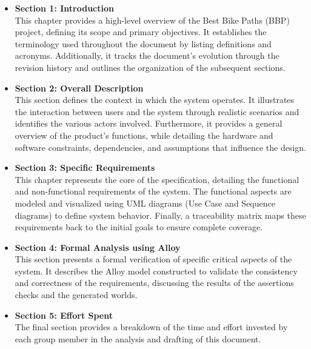 \begin{itemize}
    \item \textbf{Section 1: Introduction} \\
    This chapter provides a high-level overview of the Best Bike Paths (BBP) project, defining its scope and primary objectives. It establishes the terminology used throughout the document by listing definitions and acronyms. Additionally, it tracks the document's evolution through the revision history and outlines the organization of the subsequent sections.

    \item \textbf{Section 2: Overall Description} \\
    This section defines the context in which the system operates. It illustrates the interaction between users and the system through realistic scenarios and identifies the various actors involved. Furthermore, it provides a general overview of the product's functions, while detailing the hardware and software constraints, dependencies, and assumptions that influence the design.

    \item \textbf{Section 3: Specific Requirements} \\
    This chapter represents the core of the specification, detailing the functional and non-functional requirements of the system. The functional aspects are modeled and visualized using UML diagrams (Use Case and Sequence diagrams) to define system behavior. Finally, a traceability matrix maps these requirements back to the initial goals to ensure complete coverage.

    \item \textbf{Section 4: Formal Analysis using Alloy} \\
    This section presents a formal verification of specific critical aspects of the system. It describes the Alloy model constructed to validate the consistency and correctness of the requirements, discussing the results of the assertions checks and the generated worlds.

    \item \textbf{Section 5: Effort Spent} \\
    The final section provides a breakdown of the time and effort invested by each group member in the analysis and drafting of this document.
\end{itemize}